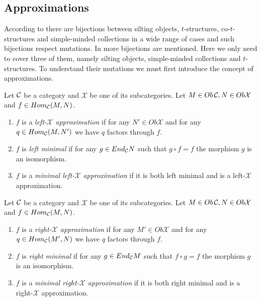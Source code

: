 \subsection{Approximations}
\indent According to \cite{KY12} there are bijections between silting objects, $t$-structures, co-$t$-structures and simple-minded collections in a wide range of cases and such bijections respect mutations. In \cite{BY13} more bijections are mentioned. Here we only need to cover three of them, namely silting objects, simple-minded collections and $t$-structures. To understand their mutations we must first introduce the concept of approximations.\\
\begin{definition}
Let $\mathcal{C}$ be a category and $\mathcal{X}$ be one of its subcategories. Let $M\in Ob\,\mathcal{C}, N\in Ob\mathcal{X}$ and $f\in Hom_{\mathcal{C}}(M,N)$.
\begin{enumerate}
\item $f$ is a \textit{left-$\mathcal{X}$ approximation} if for any $N'\in Ob\mathcal{X}$ and for any $q\in Hom_{\mathcal{C}}(M,N')$ we have $q$ factors through $f$.
\item $f$ is \textit{left minimal} if for any $g\in End_{\mathcal{C}} N$ such that $g\circ f = f$ the morphism $g$ is an isomorphism.
\item $f$ is a \textit{minimal left-$\mathcal{X}$ approximation} if it is both left minimal and is a left-$\mathcal{X}$ approximation.
\end{enumerate}
\end{definition}
\begin{definition}
Let $\mathcal{C}$ be a category and $\mathcal{X}$ be one of its subcategories. Let $M\in Ob\,\mathcal{C}, N\in Ob\mathcal{X}$ and $f\in Hom_{\mathcal{C}}(M,N)$.
\begin{enumerate}
\item $f$ is a \textit{right-$\mathcal{X}$ approximation} if for any $M'\in Ob\mathcal{X}$ and for any $q\in Hom_{\mathcal{C}}(M',N)$ we have $q$ factors through $f$.
\item $f$ is \textit{right minimal} if for any $g\in End_{\mathcal{C}} M$ such that $f\circ g = f$ the morphism $g$ is an isomorphism.
\item $f$ is a \textit{minimal right-$\mathcal{X}$ approximation} if it is both right minimal and is a right-$\mathcal{X}$ approximation.
\end{enumerate}
\end{definition}

